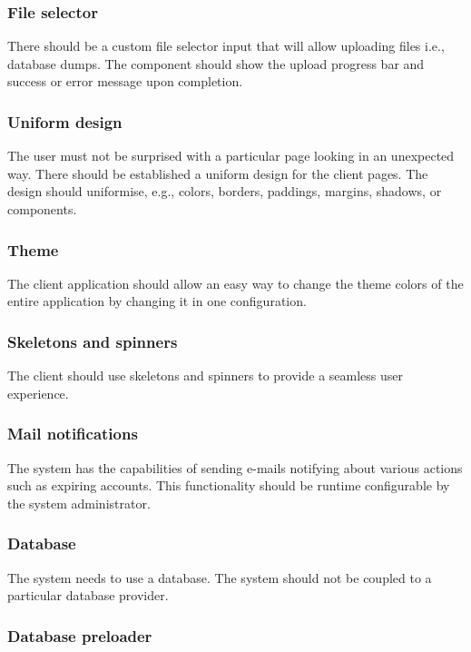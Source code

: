\documentclass[a4paper,twoside,12pt]{book}
\begin{document}
\subsubsection{File selector}

There should be a custom file selector input that will allow uploading files i.e., database dumps. The component should show the upload progress bar and success or error message upon completion.

\subsubsection{Uniform design}

The user must not be surprised with a particular page looking in an unexpected way. There should be established a uniform design for the client pages. The design should uniformise, e.g., colors, borders, paddings, margins, shadows, or components.

\subsubsection{Theme}

The client application should allow an easy way to change the theme colors of the entire application by changing it in one configuration.

\subsubsection{Skeletons and spinners}

The client should use skeletons and spinners to provide a seamless user experience.

\subsubsection{Mail notifications}

The system has the capabilities of sending e-mails notifying about various actions such as expiring accounts. This functionality should be runtime configurable by the system administrator.

\subsubsection{Database}

The system needs to use a database. The system should not be coupled to a particular database provider.

\subsubsection{Database preloader}
\end{document}

